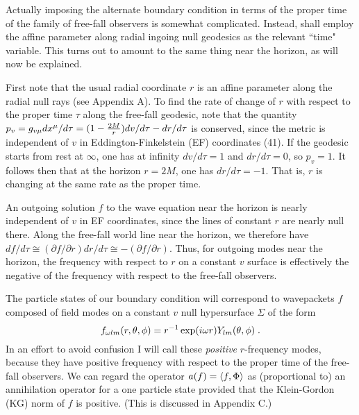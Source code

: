 Actually imposing the alternate boundary condition in terms
of the proper time of the family of free-fall observers is
somewhat complicated. Instead, shall employ the affine parameter
along radial ingoing null geodesics as the relevant ``time"
variable. This turns out to amount to the same thing near the
horizon, as will now be explained.

First note that the usual radial coordinate $r$
is an affine parameter along the radial null rays (see
Appendix A). To find the rate of change of $r$ with respect to
the proper time $\tau$ along the free-fall geodesic, note
that the quantity
$p_v=g_{v\mu}dx^\mu/d\tau=(1-{2M\over r})dv/d\tau - dr/d\tau$
is conserved, since the metric is independent of
$v$ in Eddington-Finkelstein (EF) coordinates (41).
If the geodesic starts from rest at $\infty$,
one has at infinity $dv/d\tau=1$ and $dr/d\tau=0$, so $p_v=1$.
It follows then that at the horizon $r=2M$, one has
$dr/d\tau=-1$. That is, $r$ is changing at the same rate
as the proper time.

An outgoing solution $f$ to the wave equation near the
horizon is nearly independent of $v$ in EF coordinates, since
the lines of constant $r$ are nearly null there. Along the
free-fall world line near the horizon, we therefore have
$df/d\tau\cong(\partial f/\partial r) dr/d\tau
\cong-(\partial f/\partial r)$.
Thus, for outgoing modes near the horizon,
the frequency with respect to $r$ on a constant $v$ surface
is effectively the negative of the frequency with respect to
the free-fall observers.

The particle states of our boundary condition will
correspond to wavepackets $f$ composed of field modes
on a constant $v$ null hypersurface $\Sigma$ of the form
\begin{equation}
f_{\omega lm}(r,\theta,\phi)=r^{-1}\exp(i\omega
r)Y_{lm}(\theta,\phi)\; .
\label{4.1}
\end{equation}
In an effort to avoid confusion I will call these {\it positive}
$r$-frequency modes, because they have positive frequency with
respect to the proper time of the free-fall
observers. We can regard the operator $a(f)=\langle f,\Phi\rangle$
as (proportional to) an annihilation operator for a one
particle state provided that the Klein-Gordon (KG) norm of $f$ is
positive. (This is discussed in Appendix C.)

